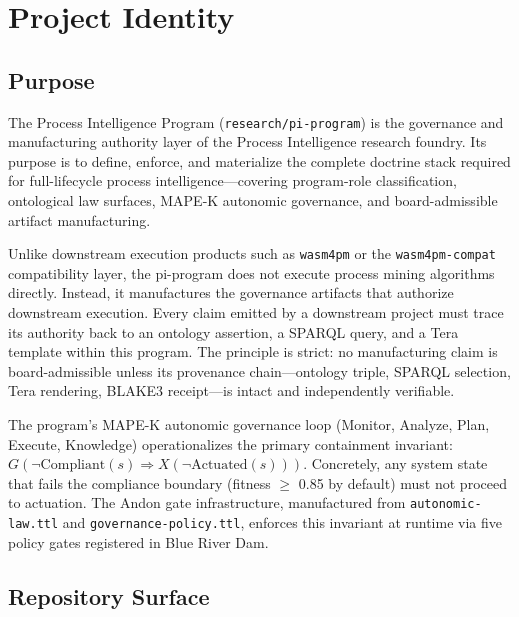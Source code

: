 
\section{Project Identity}
\label{sec:research-pi-program-identity}

\subsection{Purpose}
\label{sec:research-pi-program-identity-purpose}

The Process Intelligence Program (\texttt{research/pi-program}) is the governance and manufacturing authority layer of the Process Intelligence research foundry. Its purpose is to define, enforce, and materialize the complete doctrine stack required for full-lifecycle process intelligence---covering program-role classification, ontological law surfaces, MAPE-K autonomic governance, and board-admissible artifact manufacturing.

Unlike downstream execution products such as \texttt{wasm4pm} or the \texttt{wasm4pm-compat} compatibility layer, the pi-program does not execute process mining algorithms directly. Instead, it manufactures the governance artifacts that authorize downstream execution. Every claim emitted by a downstream project must trace its authority back to an ontology assertion, a SPARQL query, and a Tera template within this program. The principle is strict: no manufacturing claim is board-admissible unless its provenance chain---ontology triple, SPARQL selection, Tera rendering, BLAKE3 receipt---is intact and independently verifiable.

The program's MAPE-K autonomic governance loop (Monitor, Analyze, Plan, Execute, Knowledge) operationalizes the primary containment invariant: \( G(\lnot\mathrm{Compliant}(s) \Rightarrow X(\lnot\mathrm{Actuated}(s))) \). Concretely, any system state that fails the compliance boundary (fitness $\geq$ 0.85 by default) must not proceed to actuation. The Andon gate infrastructure, manufactured from \texttt{autonomic-law.ttl} and \texttt{governance-policy.ttl}, enforces this invariant at runtime via five policy gates registered in Blue River Dam.

\subsection{Repository Surface}
\label{sec:research-pi-program-identity-repository}

